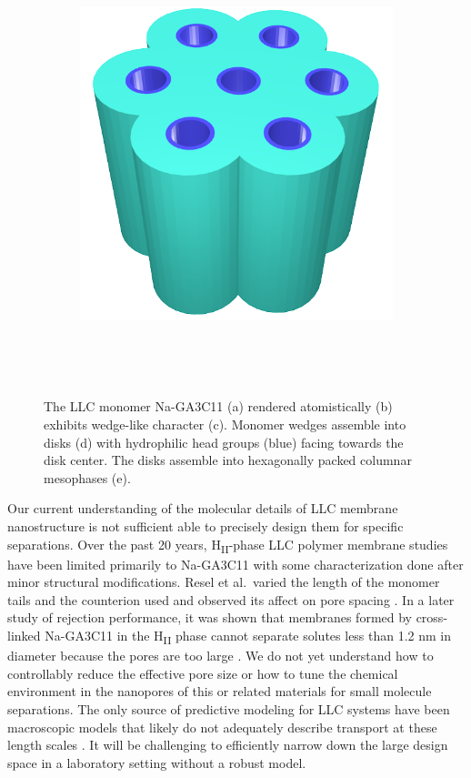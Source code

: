 \documentclass[journal=jpcbfk,manusciprt=article]{achemso}
\begin{document}
\begin{figure}
\begin{subfigure}{0.4\linewidth}
		\caption{}~\label{fig:wedge_layer}
	\end{subfigure}
	\begin{subfigure}{0.4\linewidth}
		\centering
		\includegraphics[width=\textwidth]{hexagonal_packing.png}
		\caption{}~\label{fig:hex_packing_simple}
	\end{subfigure}
	\caption{The LLC monomer Na-GA3C11 (a) rendered atomistically (b)
	exhibits wedge-like character (c). Monomer wedges assemble into disks (d) with
	hydrophilic head groups (blue) facing towards the disk center. The disks
	assemble into hexagonally packed columnar mesophases (e).}~\label{fig:assembly}
  \end{figure}

  Our current understanding of 
the molecular details of
LLC membrane 
nanostructure
is not 
sufficient
  able to precisely design them for specific separations. Over the past 20 years,
  H\textsubscript{II}-phase LLC polymer membrane studies have been limited
  primarily to Na-GA3C11 with some characterization done after minor structural
  modifications. Resel et al.~varied the length of the monomer tails and the
  counterion used and observed its affect on pore spacing
  \cite{resel_structural_2000}. In a later study of rejection performance, it was
  shown that membranes formed by cross-linked Na-GA3C11 in the
  H\textsubscript{II} phase cannot separate solutes less than 1.2 nm in diameter
  because the pores are too large \cite{zhou_supported_2005}. We do not yet
  understand how to controllably reduce the effective pore size or how to tune
  the chemical environment in the nanopores of this or related materials for
  small molecule separations. The only source of predictive modeling for LLC
  systems have been macroscopic models that likely do not adequately describe
  transport at these length scales \cite{hatakeyama_water_2011}. It will be
  challenging to efficiently narrow down the large design space in a laboratory
  setting without a robust model.
\end{document}
